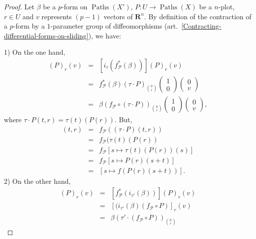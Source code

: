 \documentclass[11pt,reqno]{amsart}
\theoremstyle{definition}
\newcommand{\RR}{{\mathbf R}}
\def \P{{P}}
\def \U{{U}}
\def \X{{X}}
\newcommand{\cP}{{\mathcal P}}
\newcommand{\art}[1]{{(art.~\ref{#1})}}
\newcommand{\Paths}{\operatorname{Paths}}
\def \fPaths#1{#1_{\cP}}
\begin{document}
  \begin{proof}
    Let $\beta$ be a $p$-form
    on $\Paths(\X')$, $\P: \U \to \Paths(\X)$ be a $n$-plot,
    $r \in \U$ and $v$ represents $(p-1)$
    vectors of $\RR^n$. By definition of the contraction of a
    $p$-form by a $1$-parameter group of diffeomorphisms
    \art{Contracting-differential-forms-on-sliding}, we have:
    
    1) On the one hand, 
    \begin{eqnarray*}
      [(i_{\tau} \circ \fPaths{f}^*)(\beta)](\P)_r(v)
      & = & [i_{\tau}(\fPaths{f}^*(\beta))](\P)_r(v)
      \\  & = & \fPaths{f}^*(\beta)(\tau\cdot \P)_{0
      \choose r} \begin{pmatrix}1 \\ 0\end{pmatrix} \begin{pmatrix}0 \\ v\end{pmatrix} \\
      & = &
      \beta(\fPaths{f} \circ (\tau\cdot \P))_{0 \choose r}
      \begin{pmatrix}1 \\ 0\end{pmatrix} \begin{pmatrix}0 \\ v\end{pmatrix},
    \end{eqnarray*}
    where
    $\tau\cdot \P(t,r) = \tau(t)(\P(r))$. But, 
    \renewcommand{\theequation}{$\clubsuit$}
    \begin{eqnarray}
      [\fPaths{f} \circ (\tau\cdot \P)](t,r) & = & \fPaths{f}((\tau\cdot
      \P)(t,r)) \nonumber\\ & = & \fPaths{f}(\tau(t)(\P(r)) \nonumber\\ & = &
      \fPaths{f}[s \mapsto \tau(t)(\P(r))(s)]\nonumber\\ & = &
      \fPaths{f}[s \mapsto \P(r)(s+t)] \nonumber\\
      & = & [s \mapsto 
      f(\P(r)(s+t))].
    \end{eqnarray} 
    2) On the other hand,
    \begin{eqnarray*}[(\fPaths{f}^* \circ
      i_{\tau'})(\beta)](\P)_r(v) & = &
      [\fPaths{f}^*(i_{\tau'}(\beta))](\P)_r(v) \\ & =
      & [(i_{\tau'}(\beta)(\fPaths{f} \circ \P)]_r(v)
      \\ & = & \beta(\tau'\cdot(\fPaths{f} \circ \P))_{0 \choose r}

\end{eqnarray*}
\end{proof}
\end{document}
